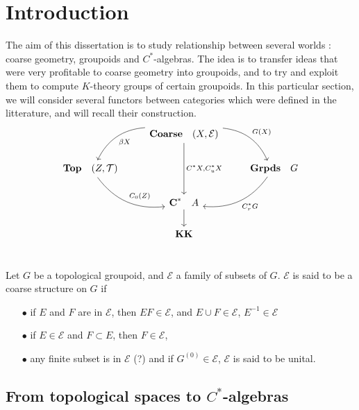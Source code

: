 \section{Introduction}


The aim of this dissertation is to study relationship between several worlds : coarse geometry, groupoids and $C^*$-algebras. The idea is to transfer ideas that were very profitable to coarse geometry into groupoids, and to try and exploit them to compute $K$-theory groups of certain groupoids. In this particular section, we will consider several functors between categories which were defined in the litterature, and will recall their construction.\\

\[\begin{tikzcd}
\  & \textbf{Coarse} \quad (X,\mathcal E) \arrow[bend left]{dr}{G(X)} \arrow[bend right]{dl}{\beta X} \arrow{dd}{C^*X,C^*_uX}& \ \\
 \textbf{Top} \quad (Z,\mathcal T) \arrow[bend right]{dr}{C_0(Z)} & \  & \textbf{Grpds}\quad G \arrow[bend left]{dl}{C^*_r G} \\
 \ & \textbf{C}^* \quad A \arrow{d} & \ \\
\ & \textbf{KK} & \ \\
\end{tikzcd}\] 

\begin{definition}
Let $G$ be a topological groupoid, and $\mathcal E$ a family of subsets of $G$. $\mathcal E$ is said to be a coarse structure on $G$ if 
\begin{itemize}
\item[$\bullet$] if $E$ and $F$ are in $\mathcal E$, then $EF\in \mathcal E$, and $E\cup F\in \mathcal E$, $E^{-1}\in \mathcal E$
\item[$\bullet$] if $E\in \mathcal E$ and $F\subset E$, then $F\in \mathcal E$,
\item[$\bullet$] any finite subset is in $\mathcal E$ (?) and if $G^{(0)}\in \mathcal E$, $\mathcal E$ is said to be unital.
\end{itemize}
\end{definition}

\subsection{From topological spaces to $C^*$-algebras}

